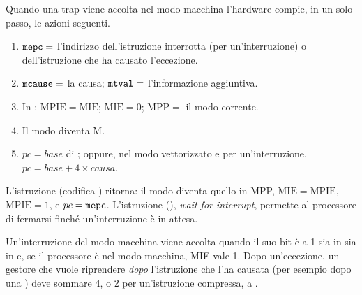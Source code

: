 Quando una trap viene accolta nel modo macchina l'hardware compie, in un solo
passo, le azioni seguenti.
\begin{enumerate}[nosep]
\item $\texttt{mepc}=$ l'indirizzo dell'istruzione interrotta (per
  un'interruzione) o dell'istruzione che ha causato l'eccezione.
\item $\texttt{mcause}=$ la causa; $\texttt{mtval}=$ l'informazione aggiuntiva.
\item In : $\mathrm{MPIE}=\mathrm{MIE}$; $\mathrm{MIE}=0$;
  $\mathrm{MPP}=$ il modo corrente.
\item Il modo diventa M.
\item $pc=\mathit{base}$ di ; oppure, nel modo vettorizzato e per
  un'interruzione, $pc=\mathit{base}+4\times\mathit{causa}$.
\end{enumerate}
L'istruzione  (codifica ) ritorna: il modo diventa
quello in MPP, $\mathrm{MIE}=\mathrm{MPIE}$, $\mathrm{MPIE}=1$, e
$pc=\texttt{mepc}$. L'istruzione  (), \emph{wait for
interrupt}, permette al processore di fermarsi finché un'interruzione è in
attesa.

Un'interruzione del modo macchina viene accolta quando il suo bit è a 1 sia in
 sia in  e, se il processore è nel modo macchina, MIE vale
1. Dopo un'eccezione, un gestore che vuole riprendere \emph{dopo} l'istruzione
che l'ha causata (per esempio dopo una ) deve sommare 4, o 2 per
un'istruzione compressa, a .

